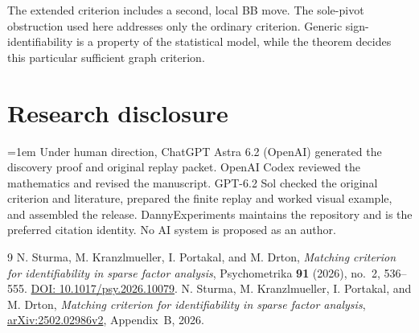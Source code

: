 \documentclass[11pt,a4paper]{amsart}
\begin{document}
The extended criterion includes a second, local BB move. The sole-pivot obstruction used here addresses only the ordinary criterion. Generic sign-identifiability is a property of the statistical model, while the theorem decides this particular sufficient graph criterion.

\section*{Research disclosure}

\begingroup{}\emergencystretch=1em\relax
Under human direction, ChatGPT Astra 6.2 (OpenAI) generated the discovery proof and original replay packet. OpenAI Codex reviewed the mathematics and revised the manuscript. GPT-6.2 Sol checked the original criterion and literature, prepared the finite replay and worked visual example, and assembled the release. DannyExperiments maintains the repository and is the preferred citation identity. No AI system is proposed as an author.
\par\endgroup

\begin{thebibliography}{9}
N. Sturma, M. Kranzlmueller, I. Portakal, and M. Drton, \emph{Matching criterion for identifiability in sparse factor analysis}, Psychometrika \textbf{91} (2026), no.~2, 536--555. \href{https://doi.org/10.1017/psy.2026.10079}{DOI: 10.1017/psy.2026.10079}.
N. Sturma, M. Kranzlmueller, I. Portakal, and M. Drton, \emph{Matching criterion for identifiability in sparse factor analysis}, \href{https://arxiv.org/html/2502.02986v2#A2}{arXiv:2502.02986v2}, Appendix~B, 2026.
\end{thebibliography}
\end{document}
